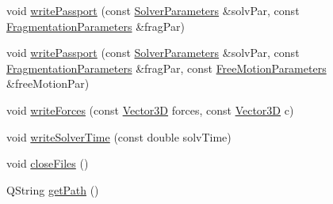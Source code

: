 \begin{DoxyCompactItemize}
\item 
void \mbox{\hyperlink{class_logger_a2cf00735b7f49b36ddb732c06d57021c}{write\+Passport}} (const \mbox{\hyperlink{struct_solver_parameters}{Solver\+Parameters}} \&solv\+Par, const \mbox{\hyperlink{struct_fragmentation_parameters}{Fragmentation\+Parameters}} \&frag\+Par)
\item 
void \mbox{\hyperlink{class_logger_acaa019eb2966ba2689730844db559200}{write\+Passport}} (const \mbox{\hyperlink{struct_solver_parameters}{Solver\+Parameters}} \&solv\+Par, const \mbox{\hyperlink{struct_fragmentation_parameters}{Fragmentation\+Parameters}} \&frag\+Par, const \mbox{\hyperlink{struct_free_motion_parameters}{Free\+Motion\+Parameters}} \&free\+Motion\+Par)
\item 
void \mbox{\hyperlink{class_logger_a6e836ef03997d4e13cc8a7f286f74561}{write\+Forces}} (const \mbox{\hyperlink{class_vector3_d}{Vector3D}} forces, const \mbox{\hyperlink{class_vector3_d}{Vector3D}} c)
\item 
void \mbox{\hyperlink{class_logger_a235ec96f50f63376c231676cd9a25e3a}{write\+Solver\+Time}} (const double solv\+Time)
\item 
void \mbox{\hyperlink{class_logger_a0d944a9f8a943075e7287ccfe2b96e5c}{close\+Files}} ()
\item 
Q\+String \mbox{\hyperlink{class_logger_af3968a9cdf1e91406037b5ad619e108a}{get\+Path}} ()
\end{DoxyCompactItemize}
